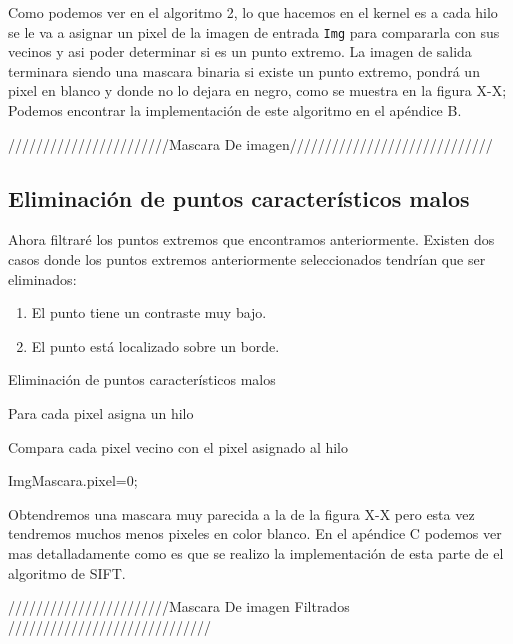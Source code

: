 Como podemos ver en el algoritmo 2, lo que hacemos en el kernel es a cada hilo se le va a asignar un pixel de la imagen de entrada \texttt{Img} para compararla con sus vecinos y asi poder determinar si es un punto extremo. La imagen de salida terminara siendo una mascara binaria si existe un punto extremo, pondrá un pixel en blanco y donde no lo dejara en negro, como se muestra en la figura X-X; Podemos encontrar la implementación de este algoritmo en el apéndice B.


///////////////////////Mascara De imagen/////////////////////////////





\subsection{Eliminación de puntos característicos malos}

Ahora filtraré los puntos extremos que encontramos anteriormente. Existen dos casos donde los puntos extremos anteriormente seleccionados tendrían que ser eliminados:
	\begin{enumerate}
		\item El punto tiene un contraste muy bajo.
		\item El punto está localizado sobre un borde.
	\end{enumerate}		

\begin{algorithm}[H]
\caption{Eliminación de puntos característicos malos}
 Para cada pixel asigna un hilo\;
 
 {
	Compara cada pixel vecino con el pixel asignado al hilo\;
	{
		{
			ImgMascara.pixel=0;
		}
	
				
	}
	
	
		
}
	
\end{algorithm}

Obtendremos una mascara muy parecida a la de la figura X-X pero esta vez tendremos muchos menos pixeles en color blanco. En el apéndice C podemos ver mas detalladamente como es que se realizo la implementación de esta parte de el algoritmo de SIFT.


///////////////////////Mascara De imagen  Filtrados   /////////////////////////////


